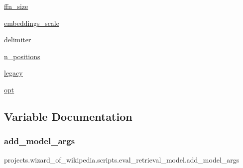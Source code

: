 \begin{DoxyCompactItemize}
\item 
\hyperlink{namespaceprojects_1_1wizard__of__wikipedia_1_1scripts_1_1eval__retrieval__model_a2cdabe9f6dda7b5d9606dc19374f5e49}{ffn\+\_\+size}
\item 
\hyperlink{namespaceprojects_1_1wizard__of__wikipedia_1_1scripts_1_1eval__retrieval__model_aaa2110a0cf4be378a72075c77dcc4ffb}{embeddings\+\_\+scale}
\item 
\hyperlink{namespaceprojects_1_1wizard__of__wikipedia_1_1scripts_1_1eval__retrieval__model_a4aca7abfbfd4c622aac44526dd789275}{delimiter}
\item 
\hyperlink{namespaceprojects_1_1wizard__of__wikipedia_1_1scripts_1_1eval__retrieval__model_a7ea239853a43f5bc17fbdf4261d8e257}{n\+\_\+positions}
\item 
\hyperlink{namespaceprojects_1_1wizard__of__wikipedia_1_1scripts_1_1eval__retrieval__model_a292c04036a96e6cb76f754d10dc6a079}{legacy}
\item 
\hyperlink{namespaceprojects_1_1wizard__of__wikipedia_1_1scripts_1_1eval__retrieval__model_a0fd806aeed2d843619bbfd4f6ab1fa27}{opt}
\end{DoxyCompactItemize}


\subsection{Variable Documentation}
\mbox{\label{namespaceprojects_1_1wizard__of__wikipedia_1_1scripts_1_1eval__retrieval__model_a4292ce71363be2e979d730f31cbef28f}} 
\subsubsection{\texorpdfstring{add\+\_\+model\+\_\+args}{add\_model\_args}}
{\footnotesize\ttfamily projects.\+wizard\+\_\+of\+\_\+wikipedia.\+scripts.\+eval\+\_\+retrieval\+\_\+model.\+add\+\_\+model\+\_\+args}



